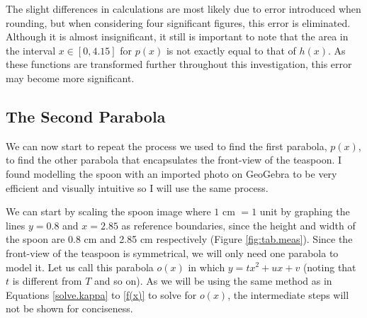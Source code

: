\documentclass[12pt]{article}
\begin{document}
The slight differences in calculations are most likely due to error introduced when rounding, but when considering four significant figures, this error is eliminated. Although it is almost insignificant, it still is important to note that the area in the interval $x \in [0,4.15]$ for $p(x)$ is not exactly equal to that of $h(x)$. As these functions are transformed further throughout this investigation, this error may become more significant. 

\subsection{The Second Parabola}
We can now start to repeat the process we used to find the first parabola, $p(x)$, to find the other parabola that encapsulates the front-view of the teaspoon. I found modelling the spoon with an imported photo on GeoGebra to be very efficient and visually intuitive so I will use the same process.

We can start by scaling the spoon image where $1$ cm $=1$ unit by graphing the lines $y=0.8$ and $x=2.85$ as reference boundaries, since the height and width of the spoon are 0.8 cm and 2.85 cm respectively (Figure \ref{fig:tab.meas}). Since the front-view of the teaspoon is symmetrical, we will only need one parabola to model it. Let us call this parabola $o(x)$ in which $y=tx^2 + ux +v$ (noting that $t$ is different from $T$ and so on). As we will be using the same method as in Equations \ref{solve.kappa} to \ref{f(x)} to solve for $o(x)$, the intermediate steps will not be shown for conciseness.  
\end{document}
